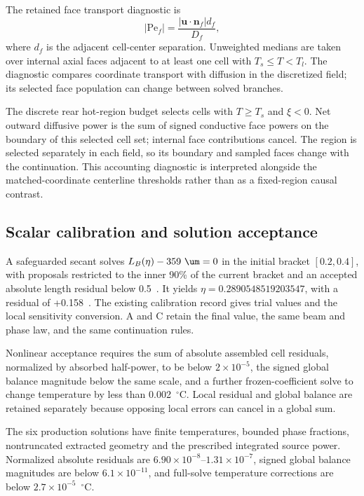 The retained face transport diagnostic is
\begin{equation}
 |\mathrm{Pe}_f|=\frac{|\bm u\cdot\bm n_f|d_f}{D_f},
 \label{eq:pe}
\end{equation}
where $d_f$ is the adjacent cell-center separation. Unweighted medians are taken over internal axial faces adjacent to at least one cell with $T_s\leq T<T_l$. The diagnostic compares coordinate transport with diffusion in the discretized field; its selected face population can change between solved branches.

The discrete rear hot-region budget selects cells with $T\geq T_s$ and $\xi<0$. Net outward diffusive power is the sum of signed conductive face powers on the boundary of this selected cell set; internal face contributions cancel. The region is selected separately in each field, so its boundary and sampled faces change with the continuation. This accounting diagnostic is interpreted alongside the matched-coordinate centerline thresholds rather than as a fixed-region causal contrast.

\subsection{Scalar calibration and solution acceptance}
A safeguarded secant solves $L_B(\eta)-359~\um=0$ in the initial bracket $[0.2,0.4]$, with proposals restricted to the inner 90\% of the current bracket and an accepted absolute length residual below 0.5~\um. It yields $\eta=0.2890548519203547$, with a residual of +0.158~\um. The existing calibration record gives trial values and the local sensitivity conversion. A and C retain the final value, the same beam and phase law, and the same continuation rules.

Nonlinear acceptance requires the sum of absolute assembled cell residuals, normalized by absorbed half-power, to be below $2\times10^{-5}$, the signed global balance magnitude below the same scale, and a further frozen-coefficient solve to change temperature by less than 0.002~$^\circ$C. Local residual and global balance are retained separately because opposing local errors can cancel in a global sum.

The six production solutions have finite temperatures, bounded phase fractions, nontruncated extracted geometry and the prescribed integrated source power. Normalized absolute residuals are $6.90\times10^{-8}$--$1.31\times10^{-7}$, signed global balance magnitudes are below $6.1\times10^{-11}$, and full-solve temperature corrections are below $2.7\times10^{-5}$~$^\circ$C.
